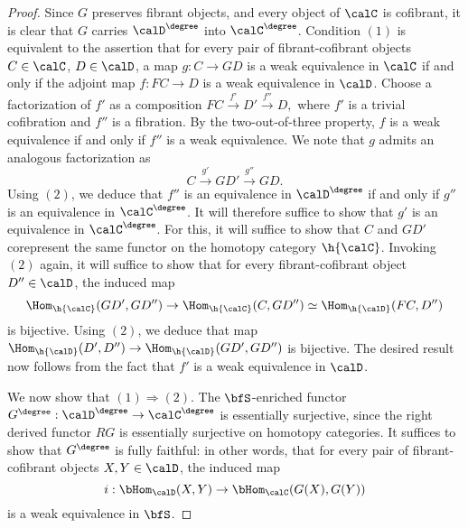 \begin{proof}
Since $G$ preserves fibrant objects, and every object of $\calC$ is cofibrant, it is clear that
$G$ carries $\calD^{\degree}$ into $\calC^{\degree}$. Condition $(1)$
is equivalent to the assertion that for every pair of fibrant-cofibrant objects
$C \in \calC$, $D \in \calD$, a map
$g: C \rightarrow GD$ is a weak equivalence in $\calC$ if and only if the adjoint map
$f: FC \rightarrow D$ is a weak equivalence in $\calD$. Choose a factorization of $f'$ as a composition
$FC \stackrel{f'}{\rightarrow} D' \stackrel{f''}{\rightarrow} D,$
where $f'$ is a trivial cofibration and $f''$ is a fibration. By the two-out-of-three property,
$f$ is a weak equivalence if and only if $f''$ is a weak equivalence. We note that
$g$ admits an analogous factorization as
$$ C \stackrel{g'}{\rightarrow} GD' \stackrel{g''}{\rightarrow} GD.$$
Using $(2)$, we deduce that $f''$ is an equivalence in $\calD^{\degree}$ if and only if
$g''$ is an equivalence in $\calC^{\degree}$. It will therefore suffice to show that
$g'$ is an equivalence in $\calC^{\degree}$. For this, it will suffice to show that
$C$ and $GD'$ corepresent the same functor on the homotopy category $\h{\calC}$.
Invoking $(2)$ again, it will suffice to show that for every fibrant-cofibrant object
$D'' \in \calD$, the induced map
$$\Hom_{ \h{\calC} }( GD', GD'') \rightarrow \Hom_{\h{\calC}}( C, GD'')
\simeq \Hom_{\h{\calD}}( FC, D'')$$ is bijective. Using $(2)$, 
we deduce that map $\Hom_{\h{\calD}}(D',D'') \rightarrow \Hom_{\h{\calD}}( GD', GD'')$
is bijective. The desired result now follows from the fact that $f'$ is a weak equivalence in $\calD$.

We now show that $(1) \Rightarrow (2)$.
The $\bfS$-enriched functor $G^{\degree}: \calD^{\degree} \rightarrow \calC^{\degree}$ is essentially surjective, since the right derived functor $RG$ is essentially surjective on homotopy categories. It suffices to show that $G^{\degree}$ is fully faithful: in other words, that for every pair of fibrant-cofibrant objects $X,Y \in \calD$, the induced map
$$ i: \bHom_{\calD}(X,Y) \rightarrow \bHom_{\calC}(G(X),G(Y))$$ 
is a weak equivalence in $\bfS$.


\end{proof}
